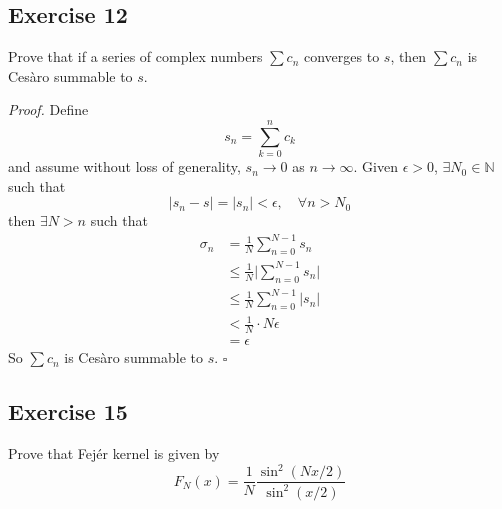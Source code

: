 \documentclass[12pt]{article}
\newenvironment{proof}{\textit{Proof.}}{\hfill$\square$}
\newcommand{\bbn}{\mathbb{N}}
\begin{document}
\subsection*{Exercise 12}
Prove that if a series of complex numbers $\sum c_n$ converges to $s$, then $\sum c_n$ is Cesàro summable to $s$.

\vspace{2em}
\begin{proof}
    Define
    \begin{equation*}
        s_n=\sum_{k=0}^{n}c_k
    \end{equation*}
    and assume without loss of generality, $s_n\to0$ as $n\to\infty$.
    Given $\epsilon >0$, $\exists N_0\in\bbn$ such that
    \begin{equation*}
        |s_n-s|=|s_n|<\epsilon, \hspace{1em}\forall n>N_0
    \end{equation*}
    then $\exists N>n$ such that
    \begin{align*}
        \sigma_n&=\frac{1}{N}\sum_{n=0}^{N-1}s_n \\
        &\le\frac{1}{N}\Big|\sum_{n=0}^{N-1}s_n\Big| \\
        &\le\frac{1}{N}\sum_{n=0}^{N-1}|s_n| \\
        &<\frac{1}{N}\cdot N\epsilon \\
        &=\epsilon
    \end{align*}
    So $\sum c_n$ is Cesàro summable to $s$.
\end{proof}
\newpage

\subsection*{Exercise 15}
Prove that Fejér kernel is given by
\begin{equation*}
    F_N(x)=\frac{1}{N}\frac{\sin^2(Nx/2)}{\sin^2(x/2)}
\end{equation*}
\end{document}
